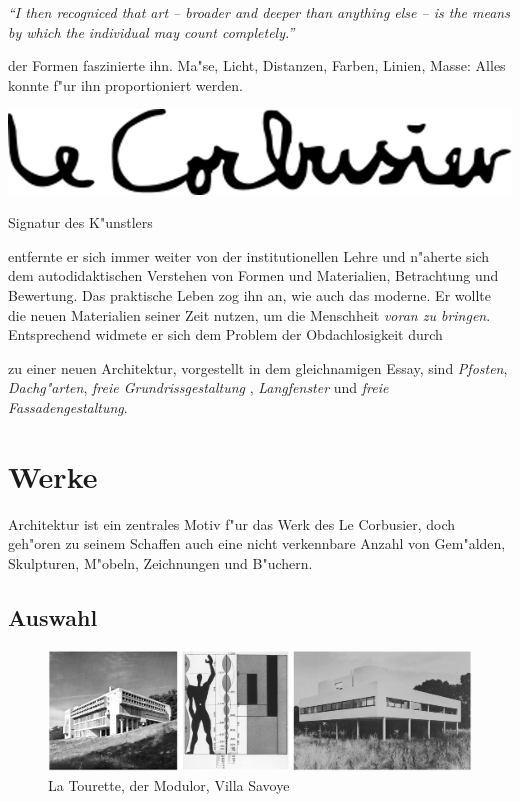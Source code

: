 \documentclass[a4paper]{tufte-handout}
\begin{document}
\emph{"`I then recogniced that art -- broader and deeper than anything else -- is the means by which the individual may count completely."'}\cite{corbusier1948new}

 der Formen faszinierte ihn. Ma"se, Licht, Distanzen, Farben, Linien, Masse: Alles konnte f"ur ihn proportioniert werden. 

\begin{marginfigure}%
  \includegraphics[width=(\linewidth)]{signature.png}
  \caption{Signatur des K"unstlers}
  \label{fig:signature}
\end{marginfigure}


 entfernte er sich immer weiter von der institutionellen Lehre und n"aherte sich dem autodidaktischen Verstehen von Formen und Materialien, Betrachtung und Bewertung. Das praktische Leben zog ihn an, wie auch das moderne. Er wollte die neuen Materialien seiner Zeit nutzen, um die Menschheit \emph{voran zu bringen}. Entsprechend widmete er sich dem Problem der Obdachlosigkeit durch

 zu einer neuen Architektur, vorgestellt in dem gleichnamigen Essay\cite{corbusier1958vers}, sind \emph{Pfosten}, \emph{Dachg"arten}, \emph{freie Grundrissgestaltung} , \emph{Langfenster} und \emph{freie Fassadengestaltung}.


\section{Werke}\label{sec:werke}

Architektur ist ein zentrales Motiv f"ur das Werk des Le Corbusier, doch geh"oren zu seinem Schaffen auch eine nicht verkennbare Anzahl von Gem"alden, Skulpturen, M"obeln, Zeichnungen und B"uchern.

\subsection{Auswahl}

\begin{figure}[h]
  \includegraphics[width=\linewidth]{slideshow}%
  \caption{La Tourette, der Modulor, Villa Savoye}%
  \label{fig:fullfig}%
\end{figure}
\end{document}
